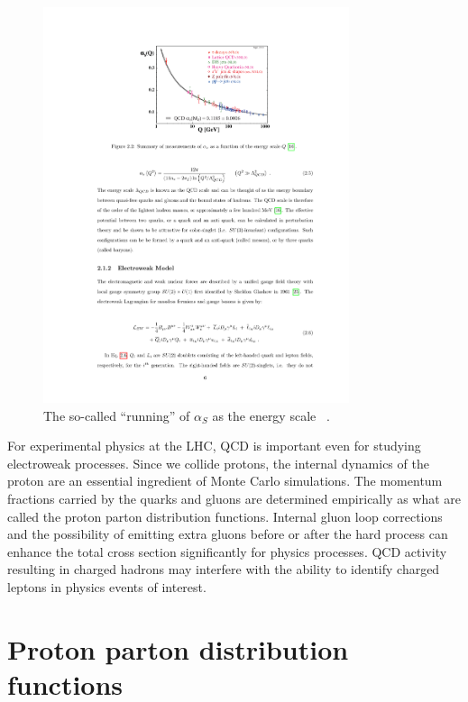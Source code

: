 \begin{figure}[!hbtp]
  \centering
    \includegraphics[width=0.80\textwidth]{figures/alphaS_running.pdf}
  \caption{The so-called ``running'' of $\alpha_S$ as the energy scale ~\cite{PhysRevD.98.030001}.} 
  \label{fig:alphaS}
\end{figure}

For experimental physics at the LHC, QCD is important even for studying electroweak processes.
Since we collide protons, the internal dynamics of the proton are an essential ingredient of Monte Carlo simulations.
The momentum fractions carried by the quarks and gluons are determined empirically as what are called the proton parton distribution functions.
Internal gluon loop corrections and the possibility of emitting extra gluons before or after the hard process can enhance the total cross section significantly for physics processes.
QCD activity resulting in charged hadrons may interfere with the ability to identify charged leptons in physics events of interest.
\clearpage
\section{Proton parton distribution functions}

